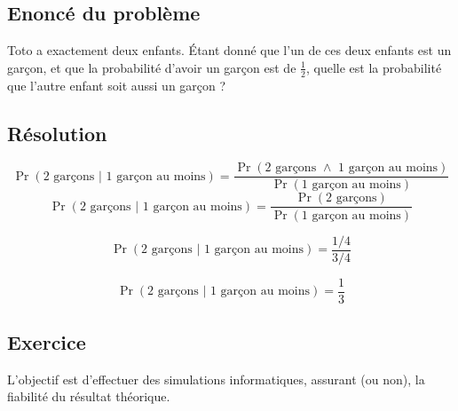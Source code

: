 

\subsection{Enoncé du problème}
Toto a exactement deux enfants.
Étant donné que l'un de ces deux enfants est un garçon,
et que la probabilité d'avoir un garçon est de $\frac{1}{2}$, 
quelle est la probabilité que l'autre enfant soit aussi un garçon ?

\subsection{Résolution}
$$
\Pr(\text{2 garçons } | \text{ 1 garçon au moins}) =
 \frac {\Pr(\text{2 garçons } \wedge 
 			\text{ 1 garçon au moins})}
 		{\Pr(\text{1 garçon au moins})}
$$
$$
\Pr(\text{2 garçons } | \text{ 1 garçon au moins}) =
  \frac
 {\Pr(\text{2 garçons})}
 {\Pr(\text{1 garçon au moins})}
$$

$$
\Pr(\text{2 garçons } | \text{ 1 garçon au moins}) =
 \frac{1/4}{3/4} 
$$

$$
\Pr(\text{2 garçons } | \text{   1 garçon au moins}) =
 \frac{1}{3} 
$$


\subsection{Exercice}
L'objectif est d'effectuer des simulations informatiques,
assurant (ou non), la fiabilité du résultat théorique.

